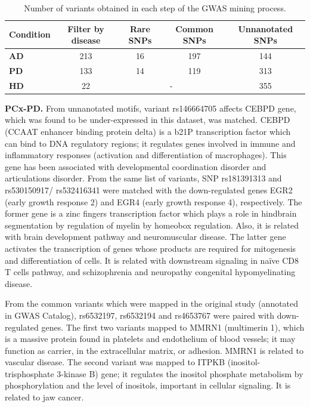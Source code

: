 \begin{table}[ht]
\centering
\caption{Number of variants obtained in each step of the GWAS mining process.}
\label{tab:gwas}
\begin{tabular}{lcccc}
\hline
\textbf{Condition} & \textbf{Filter by disease} & \textbf{Rare SNPs} & \textbf{Common SNPs} & \textbf{Unnanotated SNPs} \\ \hline
\textbf{AD} & 213 & 16        & 197       & 144 \\
\textbf{PD} & 133 & 14        & 119       & 313 \\
\textbf{HD} & 22  & \multicolumn{2}{c}{-} & 355 \\ \hline
\end{tabular}

\end{table}

\textbf{PCx-PD.} From unnanotated motifs, variant rs146664705 affects CEBPD gene, which was found to be under-expressed in this dataset, was matched. CEBPD (CCAAT enhancer binding protein delta) is a b21P transcription factor which can bind to DNA regulatory regions; it regulates genes involved in immune and inflammatory responses (activation and differentiation of macrophages). This gene has been associated with developmental coordination disorder and articulations disorder. From the same list of variants, SNP rs181391313 and rs530150917/ rs532416341 were matched with the down-regulated genes EGR2 (early growth response 2) and EGR4 (early growth response 4), respectively. The former gene is a zinc fingers transcription factor which plays a role in hindbrain segmentation by regulation of myelin by homeobox regulation. Also, it is related with brain development pathway and neuromuscular disease. The latter gene activates the transcription of genes whose products are required for mitogenesis and differentiation of cells. It is related with downstream signaling in naïve CD8 T cells pathway, and schizophrenia and neuropathy congenital hypomyelinating disease.

From the common variants which were mapped in the original study (annotated in GWAS Catalog), rs6532197, rs6532194 and rs4653767 were paired with down-regulated genes. The first two variants mapped to MMRN1 (multimerin 1), which is a massive protein found in platelets and endothelium of blood vessels; it may function as carrier, in the extracellular matrix, or adhesion. MMRN1 is related to vascular disease. The second variant was mapped to ITPKB (inositol-trisphosphate 3-kinase B) gene; it regulates the inositol phosphate metabolism by phosphorylation and the level of inositols, important in cellular signaling. It is related to jaw cancer.

